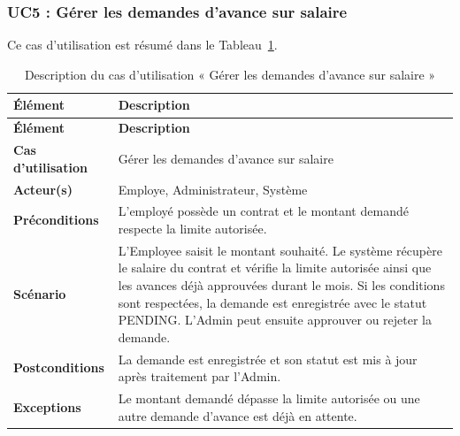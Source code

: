 
\subsubsection{UC5 : Gérer les demandes d'avance sur salaire}
Ce cas d'utilisation est résumé dans le Tableau~\ref{tab:uc5-avance-salaire}.


\begin{longtable}{|>{\RaggedRight\arraybackslash}p{4cm}|>{\RaggedRight\arraybackslash}p{10.5cm}|}
\caption{Description du cas d'utilisation « Gérer les demandes d'avance sur salaire »}
\label{tab:uc5-avance-salaire}\\
\hline

\textbf{Élément} & \textbf{Description} \\

\hline

\endfirsthead

\hline

\textbf{Élément} & \textbf{Description} \\

\hline

\endhead

\textbf{Cas d'utilisation} &
Gérer les demandes d'avance sur salaire \\

\hline

\textbf{Acteur(s)} &
Employe, Administrateur, Système \\

\hline

\textbf{Préconditions} &
L'employé possède un contrat et le montant demandé respecte la limite autorisée. \\

\hline

\textbf{Scénario} &
L'Employee saisit le montant souhaité. Le système récupère le salaire du contrat et vérifie la limite autorisée ainsi que les avances déjà approuvées durant le mois. Si les conditions sont respectées, la demande est enregistrée avec le statut PENDING. L'Admin peut ensuite approuver ou rejeter la demande. \\

\hline

\textbf{Postconditions} &
La demande est enregistrée et son statut est mis à jour après traitement par l'Admin. \\

\hline

\textbf{Exceptions} &
Le montant demandé dépasse la limite autorisée ou une autre demande d'avance est déjà en attente. \\

\hline


\end{longtable}


